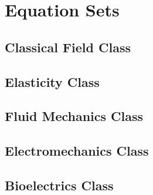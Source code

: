 \clearemptydoublepage
\chapter{Equation Sets}
\label{cha:equationsets}

\section{Classical Field Class}









\section{Elasticity Class}
\clearpage

\clearpage

\clearpage

\section{Fluid Mechanics Class}

\clearpage

\clearpage

\clearpage

\clearpage

\clearpage


\section{Electromechanics Class}

\clearpage

\clearpage


\section{Bioelectrics Class}
\clearpage

\clearpage
%
%

